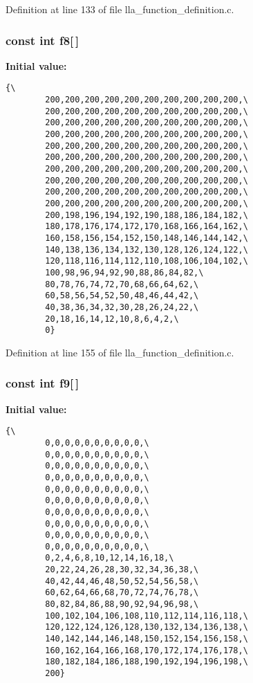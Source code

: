 Definition at line 133 of file lla\_\-function\_\-definition.c.
\subsubsection{\setlength{\rightskip}{0pt plus 5cm}const int {\bf f8}[$\,$]}\label{lla__function__definition_8c_a7}


{\bf Initial value:}

\footnotesize\begin{verbatim}{\
        200,200,200,200,200,200,200,200,200,200,\
        200,200,200,200,200,200,200,200,200,200,\
        200,200,200,200,200,200,200,200,200,200,\
        200,200,200,200,200,200,200,200,200,200,\
        200,200,200,200,200,200,200,200,200,200,\
        200,200,200,200,200,200,200,200,200,200,\
        200,200,200,200,200,200,200,200,200,200,\
        200,200,200,200,200,200,200,200,200,200,\
        200,200,200,200,200,200,200,200,200,200,\
        200,200,200,200,200,200,200,200,200,200,\
        200,198,196,194,192,190,188,186,184,182,\
        180,178,176,174,172,170,168,166,164,162,\
        160,158,156,154,152,150,148,146,144,142,\
        140,138,136,134,132,130,128,126,124,122,\
        120,118,116,114,112,110,108,106,104,102,\
        100,98,96,94,92,90,88,86,84,82,\
        80,78,76,74,72,70,68,66,64,62,\
        60,58,56,54,52,50,48,46,44,42,\
        40,38,36,34,32,30,28,26,24,22,\
        20,18,16,14,12,10,8,6,4,2,\
        0}
\end{verbatim}\normalsize 


Definition at line 155 of file lla\_\-function\_\-definition.c.
\subsubsection{\setlength{\rightskip}{0pt plus 5cm}const int {\bf f9}[$\,$]}\label{lla__function__definition_8c_a8}


{\bf Initial value:}

\footnotesize\begin{verbatim}{\
        0,0,0,0,0,0,0,0,0,0,\
        0,0,0,0,0,0,0,0,0,0,\
        0,0,0,0,0,0,0,0,0,0,\
        0,0,0,0,0,0,0,0,0,0,\
        0,0,0,0,0,0,0,0,0,0,\
        0,0,0,0,0,0,0,0,0,0,\
        0,0,0,0,0,0,0,0,0,0,\
        0,0,0,0,0,0,0,0,0,0,\
        0,0,0,0,0,0,0,0,0,0,\
        0,0,0,0,0,0,0,0,0,0,\
        0,2,4,6,8,10,12,14,16,18,\
        20,22,24,26,28,30,32,34,36,38,\
        40,42,44,46,48,50,52,54,56,58,\
        60,62,64,66,68,70,72,74,76,78,\
        80,82,84,86,88,90,92,94,96,98,\
        100,102,104,106,108,110,112,114,116,118,\
        120,122,124,126,128,130,132,134,136,138,\
        140,142,144,146,148,150,152,154,156,158,\
        160,162,164,166,168,170,172,174,176,178,\
        180,182,184,186,188,190,192,194,196,198,\
        200}
\end{verbatim}\normalsize 


